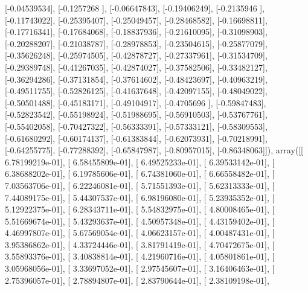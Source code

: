 \documentclass{article}
\begin{document}
       [-0.04539534],
       [-0.1257268 ],
       [-0.06647843],
       [-0.19406249],
       [-0.2135946 ],
       [-0.11743022],
       [-0.25395407],
       [-0.25049457],
       [-0.28468582],
       [-0.16698811],
       [-0.17716341],
       [-0.17684068],
       [-0.18837936],
       [-0.21610095],
       [-0.31098903],
       [-0.20288207],
       [-0.21038787],
       [-0.28978853],
       [-0.23504615],
       [-0.25877079],
       [-0.35626248],
       [-0.25974505],
       [-0.42878727],
       [-0.27337961],
       [-0.31534709],
       [-0.29389748],
       [-0.41267035],
       [-0.42874027],
       [-0.37582506],
       [-0.33482127],
       [-0.36294286],
       [-0.37131854],
       [-0.37614602],
       [-0.48423697],
       [-0.40963219],
       [-0.49511755],
       [-0.52826125],
       [-0.41637648],
       [-0.42097155],
       [-0.48049022],
       [-0.50501488],
       [-0.45183171],
       [-0.49104917],
       [-0.4705696 ],
       [-0.59847483],
       [-0.52823542],
       [-0.55198924],
       [-0.51988695],
       [-0.56910503],
       [-0.53767761],
       [-0.55402058],
       [-0.70427322],
       [-0.56333391],
       [-0.57333121],
       [-0.58309553],
       [-0.61680292],
       [-0.60174137],
       [-0.61383844],
       [-0.62073931],
       [-0.70218991],
       [-0.64255775],
       [-0.77288392],
       [-0.65847987],
       [-0.80957015],
       [-0.86348063]]), array([[  6.78199219e-01],
       [  6.58455809e-01],
       [  6.49525233e-01],
       [  6.39533142e-01],
       [  6.38688202e-01],
       [  6.19785606e-01],
       [  6.74381060e-01],
       [  6.66558482e-01],
       [  7.03563706e-01],
       [  6.22246081e-01],
       [  5.71551393e-01],
       [  5.62313333e-01],
       [  7.44089175e-01],
       [  5.44307537e-01],
       [  6.98196080e-01],
       [  5.23935352e-01],
       [  5.12922375e-01],
       [  6.28343711e-01],
       [  5.54832975e-01],
       [  4.80008465e-01],
       [  5.51669674e-01],
       [  5.43293637e-01],
       [  4.50957348e-01],
       [  4.43159402e-01],
       [  4.46997807e-01],
       [  5.67569054e-01],
       [  4.06623157e-01],
       [  4.00487431e-01],
       [  3.95386862e-01],
       [  4.33724446e-01],
       [  3.81791419e-01],
       [  4.70472675e-01],
       [  3.55893376e-01],
       [  3.40838814e-01],
       [  4.21960716e-01],
       [  4.05801861e-01],
       [  3.05968056e-01],
       [  3.33697052e-01],
       [  2.97545607e-01],
       [  3.16406463e-01],
       [  2.75396057e-01],
       [  2.78894807e-01],
       [  2.83790644e-01],
       [  2.38109198e-01],
\end{document}
